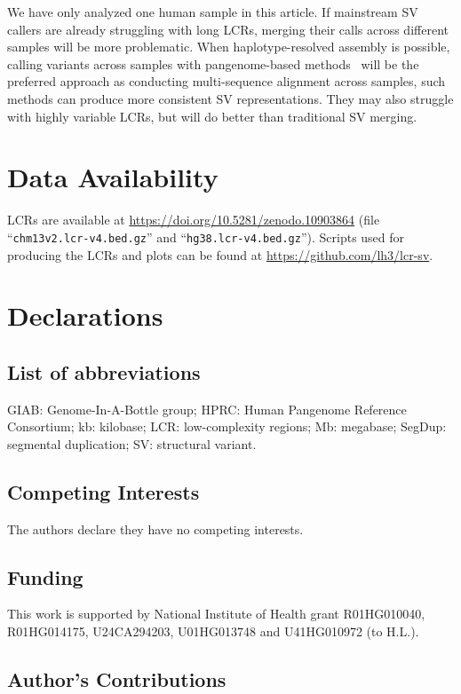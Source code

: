 \documentclass[a4paper,num-refs]{oup-contemporary}
\begin{document}
We have only analyzed one human sample in this article.
If mainstream SV callers are already struggling with long LCRs,
merging their calls across different samples will be more problematic.
When haplotype-resolved assembly is possible,
calling variants across samples with pangenome-based methods~\cite{Li:2020aa,Hickey:2024aa,Garrison:2024ab}
will be the preferred approach as conducting multi-sequence alignment across samples,
such methods can produce more consistent SV representations.
They may also struggle with highly variable LCRs,
but will do better than traditional SV merging.

\section{Data Availability}

LCRs are available at \url{https://doi.org/10.5281/zenodo.10903864}
(file ``{\tt chm13v2.lcr-v4.bed.gz}'' and ``{\tt hg38.lcr-v4.bed.gz}'').
Scripts used for producing the LCRs and plots
can be found at \url{https://github.com/lh3/lcr-sv}.

\section{Declarations}

\subsection{List of abbreviations}

GIAB: Genome-In-A-Bottle group;
HPRC: Human Pangenome Reference Consortium;
kb: kilobase;
LCR: low-complexity regions;
Mb: megabase;
SegDup: segmental duplication;
SV: structural variant.

\subsection{Competing Interests}

The authors declare they have no competing interests.

\subsection{Funding}

This work is supported by National Institute of Health grant
R01HG010040,
R01HG014175,
U24CA294203,
U01HG013748
and U41HG010972 (to H.L.).

\subsection{Author's Contributions}
\end{document}
